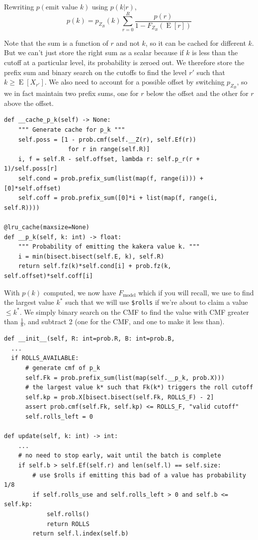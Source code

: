 \documentclass[11pt, oneside]{article}
\DeclareMathOperator{\E}{E}
\theoremstyle{plain}
\theoremstyle{definition}
\begin{document}
Rewriting \( p(\text{emit value } k) \) using \( p(k|r) \), 
\[ p(k) = p_{Z_B}(k) \sum^R_{r = 0} \frac{p(r)}{1 - F_{Z_B}(\E[r])} \] 

Note that the sum is a function of \( r \) and not \( k \), so it can
be cached for different \( k \). But we can't just store the right sum
as a scalar because if \( k \) is less than the cutoff at a particular
level, its probability is zeroed out. We therefore store the prefix sum
and binary search on the cutoffs to find the level \( r' \) such that \(
k \geq \E[X_{r'}] \). We also need to account for a possible offset by
switching \( p_{Z_B} \), so we in fact maintain two prefix sums, one for
\( r \) below the offset and the other for \( r \) above the offset.
\begin{verbatim}
def __cache_p_k(self) -> None:
    """ Generate cache for p_k """
    self.poss = [1 - prob.cmf(self.__Z(r), self.Ef(r))
                  for r in range(self.R)]
    i, f = self.R - self.offset, lambda r: self.p_r(r + 1)/self.poss[r]
    self.cond = prob.prefix_sum(list(map(f, range(i))) + [0]*self.offset)
    self.coff = prob.prefix_sum([0]*i + list(map(f, range(i, self.R))))

@lru_cache(maxsize=None)
def __p_k(self, k: int) -> float:
    """ Probability of emitting the kakera value k. """
    i = min(bisect.bisect(self.E, k), self.R)
    return self.fz(k)*self.cond[i] + prob.fz(k, self.offset)*self.coff[i]
\end{verbatim}

With \( p(k) \) computed, we now have \( F_\text{model} \) which if you will
recall, we use to find the largest value \( k^* \) such that we will use
\texttt{\$rolls} if we're about to claim a value \( \leq k^* \). We simply
binary search on the CMF to find the value with CMF greater than \( \frac{1}{8}
\), and subtract 2 (one for the CMF, and one to make it less than).
\begin{verbatim}
def __init__(self, R: int=prob.R, B: int=prob.B,
  ...
  if ROLLS_AVAILABLE:
      # generate cmf of p_k
      self.Fk = prob.prefix_sum(list(map(self.__p_k, prob.X)))
      # the largest value k* such that Fk(k*) triggers the roll cutoff
      self.kp = prob.X[bisect.bisect(self.Fk, ROLLS_F) - 2]
      assert prob.cmf(self.Fk, self.kp) <= ROLLS_F, "valid cutoff"
      self.rolls_left = 0

def update(self, k: int) -> int:
    ...
    # no need to stop early, wait until the batch is complete 
    if self.b > self.Ef(self.r) and len(self.l) == self.size:
        # use $rolls if emitting this bad of a value has probability 1/8
        if self.rolls_use and self.rolls_left > 0 and self.b <= self.kp:
            self.rolls()
            return ROLLS
        return self.l.index(self.b)
\end{verbatim}
\end{document}
